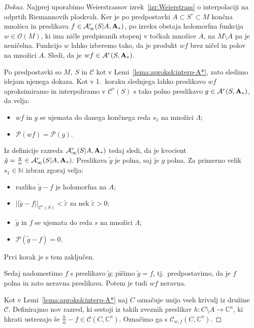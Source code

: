 \documentclass[12pt,a4paper,twoside]{article}
\theoremstyle{definition} %
\newenvironment{dokaz}[1][Dokaz]{\begin{proof}[#1]}{\end{proof}}
\theoremstyle{plain} %
\numberwithin{equation}{section}  %
\begin{document}
\begin{dokaz}
Najprej uporabimo Weierstrassov izrek~\ref{izr:Weierstrass} o interpolaciji na odprtih Riemannovih ploskvah.
Ker je po predpostavki $A \subset S^{\circ} \subset M$ končna množica in preslikava $f \in \mathcal{A}_{\infty}^{r}(S|A, \textup{\textbf{A}}_{*})$, po izreku obstaja holomorfna funkcija $w \in \mathcal{O}(M)$, ki ima ničle predpisanih stopenj v točkah množice $A$, na $M \setminus A$ pa je neničelna.
Funkcijo $w$ lahko izberemo tako, da je produkt $wf$ brez ničel in polov na množici $A$. Sledi, da je $wf \in \mathcal{A}^{r}(S, \textup{\textbf{A}}_{*})$.

Po predpostavki so $M, \ S$ in $\mathcal{C}$ kot v Lemi~\ref{lema:aproks&interp-A*}, zato sledimo idejam njenega dokaza.
Kot v 1.~koraku slednjega lahko preslikavo $wf$ aproksimiramo in interpoliramo v $\mathcal{C}^{r}(S)$ s tako polno preslikavo $g \in \mathcal{A}^{r}(S, \textup{\textbf{A}}_{*})$, da velja:
\begin{itemize}
\item $wf$ in $g$ se ujemata do danega končnega reda $s_1$ na množici $\Lambda$;
\item $\mathcal{P}(wf) = \mathcal{P}(g)$.
\end{itemize}
Iz definicije razreda $\mathcal{A}_{\infty}^{r}(S|A, \textup{\textbf{A}}_{*})$ tedaj sledi, da je kvocient $\tilde{g} = \frac{g}{w} \in \mathcal{A}_{\infty}^{r}(S|A, \textup{\textbf{A}}_{*})$. Preslikava $\tilde{g}$ je polna, saj je $g$ polna.
Za primerno velik $s_1 \in \mathbb{N}$ izbran zgoraj velja:
\begin{itemize}
\item razlika $\tilde{g}-f$ je holomorfna na $A$;
\item $||\tilde{g}-f||_{\mathcal{C}^{r}(S)} < \tilde{\varepsilon}$ za nek $\tilde{\varepsilon}>0$;
\item$\tilde{g}$ in $f$ se ujemata do reda $s$ na množici $\Lambda$;
\item $\mathcal{P}(\tilde{g}-f) = 0$.
\end{itemize}
Prvi korak je s tem zaključen. \newline

Sedaj nadomestimo $f$ s preslikavo $\tilde{g}$; pišimo $\tilde{g}=f$, tj.~predpostavimo, da je $f$ polna in zato neravna preslikava. Potem je tudi $wf$ neravna.

Kot v Lemi~\ref{lema:aproks&interp-A*} naj $C$ označuje unijo vseh krivulj iz družine $\mathcal{C}$.
Definirajmo nov razred, ki sestoji iz takih zveznih preslikav $h \colon C \setminus A \to \mathbb{C}^{n}$, ki hkrati ustrezajo še $\frac{h}{w}-f \in \mathcal{C}(C, \mathbb{C}^{n})$. Označimo ga s $\mathcal{C}_{w,f}(C, \mathbb{C}^{n})$.


\end{dokaz}
\end{document}
